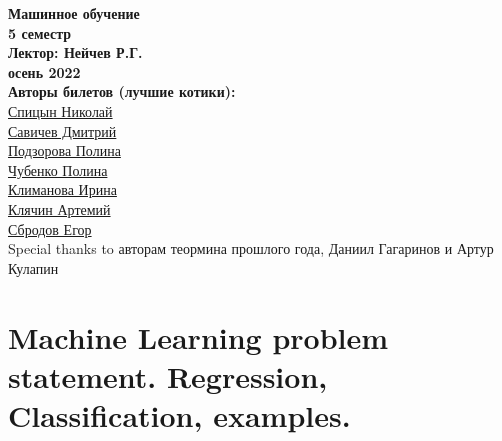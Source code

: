 


    \thispagestyle{empty}
    \BgThispage
    \begin{center}
        \vspace*{4cm}
        
        \Huge
        \textbf{Машинное обучение } \\
        \textbf{5 семестр} \\
        \textbf{Лектор: Нейчев Р.Г.} \\
        \textbf{осень 2022} \\
        
        \vspace{7cm}
        \Large
        \textbf{Авторы билетов (лучшие котики):} \\
        \href{https://vk.com/spitsynn}{Спицын Николай} \\
        \href{https://vk.com/dimasav123}{Савичев Дмитрий} \\
        \href{https://vk.com/id165779384}{Подзорова Полина} \\
        \href{https://vk.com/poli.dobro}{Чубенко Полина} \\        
        \href{https://vk.com/meraklim}{Климанова Ирина} \\
        \href{https://vk.com/artemiy.kliachin}{Клячин Артемий} \\
        \href{https://vk.com/ulegor}{Сбродов Егор} \\
        Special thanks to авторам теормина прошлого года, Даниил Гагаринов и Артур Кулапин
        
    \end{center}

\newpage

\tableofcontents
\newpage






\section{Machine Learning problem statement. Regression, Classification, examples.}


